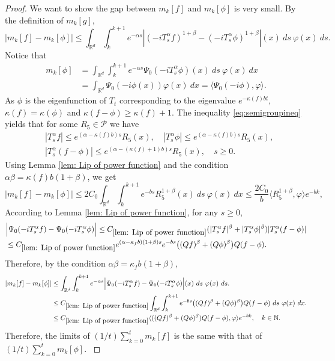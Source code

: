 \documentclass[12pt,oneside,english]{amsart}
\theoremstyle{plain}
\theoremstyle{definition}
\numberwithin{equation}{section}
\newcommand{\added}[1]{{\color{blue}#1}}\newcommand{\deleted}[1]{{\color{red}#1}}
\begin{document}
\begin{proof}
\deleted{
    We want to show the gap between $m_k[f]$ and $m_k[\phi]$ is very small. By the definition of $m_k[g]$,
    $$|m_k[f]-m_k[\phi]|\leq\int_{\mathbb{R}^d}\int_k^{k+1}e^{-\alpha s}\left|(-i T^{\alpha}_s f)^{1+\beta}-(-i T^{\alpha}_s \phi)^{1+\beta}\right|(x)~ds~\varphi(x)~ds.$$
    }
    \added{
    Notice that
        \begin{align}\label{parameter of mkphi}
        m_k[\phi]&=\int_{\mathbb{R}^d}\int_k^{k+1} e^{-\alpha s}\Psi_0(-iT_{s}^{\alpha}\phi)(x)~ds~\varphi(x)~dx\\
        &=\int_{\mathbb{R}^d}\Psi_0(-i\phi(x))\varphi (x)~dx=\langle \Psi_0(-i\phi),\varphi\rangle.
    \end{align}
    }
    \deleted{
    As $\phi$ is the eigenfunction of $T_t$ corresponding to the eigenvalue $e^{-\kappa(f)bt}$,  $\kappa(f)=\kappa(\phi)$ and $\kappa(f-\phi)\geq \kappa(f)+1$. The inequality \eqref{eq:semigroupineq} yields that for some $R_5\in\mathcal{P}$ we have
    \begin{align*}
        &|T_s^{\alpha}f|\leq e^{(\alpha-\kappa(f)b)s}R_5(x), \quad|T_s^{\alpha}\phi|\leq e^{(\alpha-\kappa(f)b)s}R_5(x), \\
        &|T_s^{\alpha}(f-\phi)|\leq e^{(\alpha-(\kappa(f)+1)b)s}R_5(x), \quad s\geq0.
    \end{align*}
  Using Lemma \ref{lem: Lip of power function} and the condition $\alpha\beta=\kappa(f)b(1+\beta)$, we get
    $$|m_k[f]-m_k[\phi]|\leq2C_0\int_{\mathbb{R}^d}\int_k^{k+1}e^{-bs}R_5^{1+\beta}(x)~ds~\varphi(x)~dx\leq \frac{2C_0}{b}\langle R_5^{1+\beta},\varphi\rangle e^{-bk},$$
    }
    \added{
    According to Lemma \ref{lem: Lip of power function}, for any $s\geq 0$,
    \begin{align}
        &\Big|\Psi_0(-iT^{\alpha}_s f)-\Psi_0(-iT^{\alpha}_s\phi)\Big|\leq C_{\ref{lem: Lip of power function}}(|T^{\alpha}_sf|^{\beta}+|T^{\alpha}_s\phi|^{\beta})|T^{\alpha}_s(f-\phi)|
        \\& \leq C_{\ref{lem: Lip of power function}}e^{(\alpha-\kappa_f b)(1+\beta)s}e^{-bs}\big((Qf)^{\beta}+(Q\phi)^{\beta}\big)Q(f-\phi).
    \end{align}
    Therefore, by the condition $\alpha\beta=\kappa_fb(1+\beta)$,
    \begin{align}
        |m_k[f]-m_k[\phi]|&\leq\int_{\mathbb{R}^d}\int_k^{k+1}e^{-\alpha s}\Big|\Psi_0(-iT^{\alpha}_s f)-\Psi_0(-iT^{\alpha}_s\phi)\Big|(x)~ds~\varphi(x)~ds.
        \\&\leq C_{\ref{lem: Lip of power function}}\int_{\mathbb{R}^d}\int_{k}^{k+1} e^{-bs}\big((Qf)^{\beta}+(Q\phi)^{\beta}\big)Q(f-\phi)~ds~ \varphi(x)~dx.
        \\&\leq C_{\ref{lem: Lip of power function}}\langle((Qf)^{\beta}+(Q\phi)^{\beta})Q(f-\phi), \varphi\rangle e^{-bk},\quad k \in \mathbb{N}.
    \end{align}
    Therefore, the limits of $(1/t)\sum_{k=0}^tm_k[f]$ is the same with that of $(1/t)\sum_{k=0}^tm_k[\phi]$.
    }
    

\end{proof}
\end{document}
